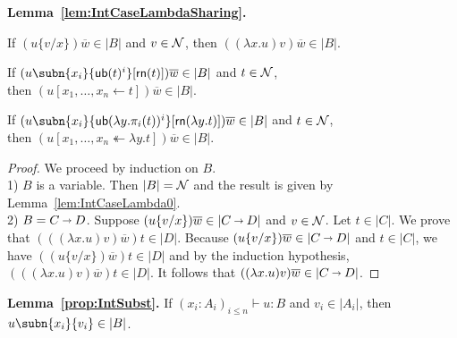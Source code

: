 \medskip
\noindent
\textbf{Lemma~\ref{lem:IntCaseLambdaSharing}.}
\quad
\begin{compactenum}[\upshape(i)]
%
\item If $(u\{v/x\})\overline{w} \in |B|$ and $v\in\mathcal{N}$, then $((\lambda x.u) v)\overline{w} \in |B|$.
%
\item If $(u\subn{x_i}{\sn(t)^i}[\sh (t)])\overline{w} \in |B|$ and $t\in\mathcal{N}$, 
	\\ then $(u[x_1,\dots,x_n \leftarrow t])\overline{w} \in |B|$.
%
\item If $(u\subn{x_i}{\sn(\lambda y.\pi_i(t))^i}[\sh (\lambda y.t)])\overline{w} \in |B|$ and $t\in\mathcal{N}$,
	\\ then $(u[x_1,\dots,x_n \twoheadleftarrow \lambda y.t])\overline{w} \in |B|$.
%
\end{compactenum}


\begin{proof}
 We proceed by induction on $B$.
\\
1) $B$ is a variable. Then $|B| = \mathcal{N}$ and the result is given by Lemma~\ref{lem:IntCaseLambda0}.
\\
2) $B= C\vlim D$.
Suppose $(u\{v/x\})\overline{w} \in |C\vlim D|$ and $v\in\mathcal{N}$. Let $t\in|C|$. We prove that  $(((\lambda x.u) v)\overline{w})t \in |D|$. Because $(u\{v/x\})\overline{w} \in |C\vlim D|$ and $t\in|C|$, we have $((u\{v/x\})\overline{w})t \in |D|$ and by the induction hypothesis, $(((\lambda x.u) v)\overline{w})t \in |D|$. It follows that $((\lambda x.u) v)\overline{w} \in |C\vlim D|$.
\end{proof}
%




\medskip
\noindent
\textbf{Lemma~\ref{prop:IntSubst}.}
\quad
If $(x_i:A_i)_{i\leq n}\vdash u:B$ and $v_i \in |A_i|$, then $u\subn{x_i}{v_i} \in |B|$.


